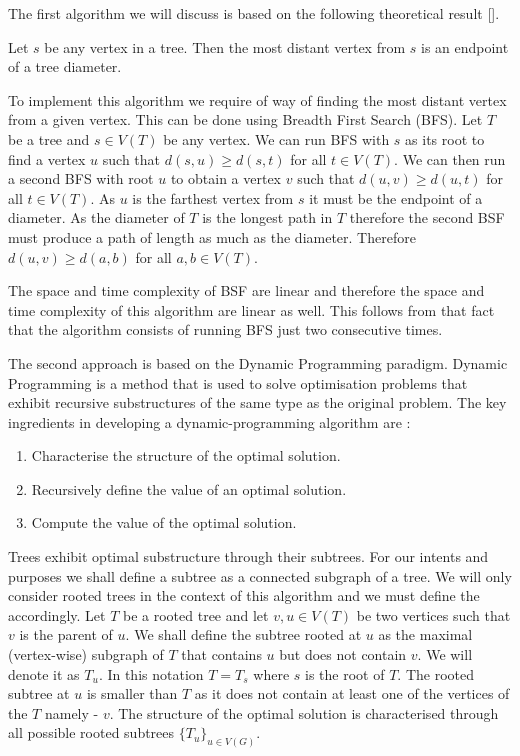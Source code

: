 The first algorithm we will discuss is based on the following theoretical result [].

\begin{lem} Let $s$ be any vertex in a tree. Then the most distant vertex from $s$ is an endpoint of a tree diameter. \end{lem}

    To implement this algorithm we require of way of finding the most distant vertex from a given vertex. This can be done using Breadth First Search (BFS). Let $T$ be a tree and $s \in V(T)$ be any vertex. We can run BFS with $s$ as its root to find a vertex $u$ such that $d(s, u) \ge d(s, t)$ for all $t \in V(T)$. We can then run a second BFS with root $u$ to obtain a vertex $v$ such that $d(u, v) \ge d(u, t)$ for all $t \in V(T)$. As $u$ is the farthest vertex from $s$ it must be the endpoint of a diameter. As the diameter of $T$ is the longest path in $T$ therefore the second BSF must produce a path of length as much as the diameter. Therefore $d(u, v) \ge d(a, b)$ for all $a,b \in V(T)$.

The space and time complexity of BSF are linear \cite{intro-to-algo} and therefore the space and time complexity of this algorithm are linear as well. This follows from that fact that the algorithm consists of running BFS just two consecutive times.


The second approach is based on the Dynamic Programming paradigm. Dynamic Programming is a method that is used to solve optimisation problems that exhibit recursive substructures of the same type as the original problem. The key ingredients in developing a dynamic-programming algorithm are \cite{intro-to-algo}:


\begin{enumerate}
    \item Characterise the structure of the optimal solution.
    \item Recursively define the value of an optimal solution.
    \item Compute the value of the optimal solution.
\end{enumerate}


Trees exhibit optimal substructure through their subtrees. For our intents and purposes we shall define a subtree as a connected subgraph of a tree. We will only consider rooted trees in the context of this algorithm and we must define the accordingly. Let $T$ be a rooted tree and let $v, u \in V(T)$ be two vertices such that $v$ is the parent of $u$. We shall define the subtree rooted at $u$ as the maximal (vertex-wise) subgraph of $T$ that contains $u$ but does not contain $v$.  We will denote it as $T_u$. In this notation $T = T_s$ where $s$ is the root of $T$. The rooted subtree at $u$ is smaller than $T$ as it does not contain at least one of the vertices of the $T$ namely - $v$. The structure of the optimal solution is characterised through all possible rooted subtrees $\{T_u\}_{u \in V(G)}$.

